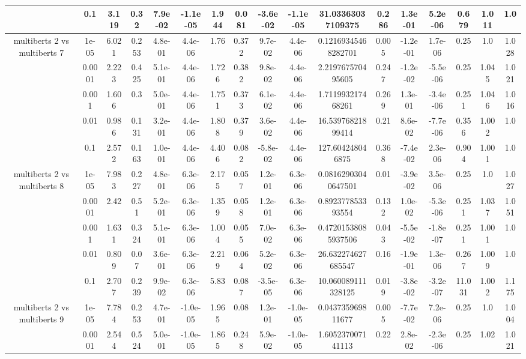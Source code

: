 \begin{tabular}{|c|c|c|c|c|c|c|c|c|c|c|c|c|c|c|c|c|}
 & 0.1 & 3.119 & 0.32 & 7.9e-02 & -1.1e-05 & 1.944 & 0.081 & -3.6e-02 & -1.1e-05 & 31.03363037109375 & 0.286 & 1.3e-01 & 5.2e-06 & 0.679 & 1.011 & 1.0 \\
\hline
\multirow{5}{*}{multiberts 2 vs multiberts 7} & 1e-05 & 6.021 & 0.253 & 4.8e-01 & 4.4e-06 & 1.76 & 0.372 & 9.7e-02 & 4.4e-06 & 0.12169345468282701 & 0.005 & -1.2e-01 & 1.7e-06 & 0.25 & 1.0 & 1.028 \\
 & 0.0001 & 2.223 & 0.425 & 5.1e-01 & 4.4e-06 & 1.726 & 0.382 & 9.8e-02 & 4.4e-06 & 2.219767570495605 & 0.247 & -1.2e-02 & -5.5e-06 & 0.25 & 1.045 & 1.021 \\
 & 0.001 & 1.606 & 0.3 & 5.0e-01 & 4.4e-06 & 1.751 & 0.373 & 6.1e-02 & 4.4e-06 & 1.711993217468261 & 0.269 & 1.3e-01 & -3.4e-06 & 0.251 & 1.046 & 1.016 \\
 & 0.01 & 0.986 & 0.131 & 3.2e-01 & 4.4e-06 & 1.808 & 0.379 & 3.6e-02 & 4.4e-06 & 16.53976821899414 & 0.21 & 8.6e-02 & -7.7e-06 & 0.356 & 1.002 & 1.0 \\
 & 0.1 & 2.572 & 0.163 & 1.0e-01 & 4.4e-06 & 4.406 & 0.082 & -5.8e-02 & 4.4e-06 & 127.604248046875 & 0.368 & -7.4e-02 & 2.3e-06 & 0.904 & 1.001 & 1.0 \\
\hline
\multirow{5}{*}{multiberts 2 vs multiberts 8} & 1e-05 & 7.983 & 0.227 & 4.8e-01 & 6.3e-06 & 2.175 & 0.057 & 1.2e-01 & 6.3e-06 & 0.08162903040647501 & 0.01 & -3.9e-02 & 3.5e-06 & 0.25 & 1.0 & 1.027 \\
 & 0.0001 & 2.42 & 0.51 & 5.2e-01 & 6.3e-06 & 1.359 & 0.058 & 1.2e-01 & 6.3e-06 & 0.892377853393554 & 0.132 & 1.0e-02 & -5.3e-06 & 0.251 & 1.037 & 1.051 \\
 & 0.001 & 1.631 & 0.324 & 5.1e-01 & 6.3e-06 & 1.004 & 0.055 & 7.0e-02 & 6.3e-06 & 0.47201538085937506 & 0.043 & -5.5e-02 & -1.8e-07 & 0.251 & 1.001 & 1.0 \\
 & 0.01 & 0.809 & 0.07 & 3.6e-01 & 6.3e-06 & 2.219 & 0.064 & 5.2e-02 & 6.3e-06 & 26.632274627685547 & 0.16 & -1.9e-01 & 1.3e-06 & 0.267 & 1.009 & 1.0 \\
 & 0.1 & 2.707 & 0.239 & 9.9e-02 & 6.3e-06 & 5.83 & 0.087 & -3.5e-05 & 6.3e-06 & 10.060089111328125 & 0.019 & -3.8e-02 & -3.2e-07 & 11.031 & 1.002 & 1.175 \\
\hline
\multirow{5}{*}{multiberts 2 vs multiberts 9} & 1e-05 & 7.784 & 0.253 & 4.7e-01 & -1.0e-05 & 1.965 & 0.08 & 1.2e-01 & -1.0e-05 & 0.043735969811677 & 0.005 & -7.7e-02 & 7.2e-06 & 0.25 & 1.0 & 1.004 \\
 & 0.0001 & 2.544 & 0.524 & 5.0e-01 & -1.0e-05 & 1.865 & 0.248 & 5.9e-02 & -1.0e-05 & 1.605237007141113 & 0.22 & 2.8e-02 & -2.3e-06 & 0.25 & 1.02 & 1.021 \\

\end{tabular}
